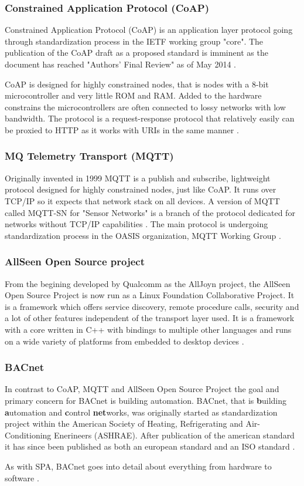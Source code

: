 \subsubsection{Constrained Application Protocol (CoAP)}
Constrained Application Protocol (CoAP) is an application layer protocol
going through standardization process in the IETF working group "core". The
publication of the CoAP draft as a proposed standard is imminent as the
document has reached "Authors' Final Review" as of May 2014 \cite{web:wgcore}.

CoAP is designed for highly constrained nodes, that is nodes with a 8-bit
microcontroller and very little ROM and RAM. Added to the hardware constrains
the microcontrollers are often connected to lossy networks with low bandwidth.
The protocol is a request-response protocol that relatively easily can be
proxied to HTTP as it works with URIs in the same manner \cite{web:draftcoap}.

\subsubsection{MQ Telemetry Transport (MQTT)}
Originally invented in 1999 MQTT is a publish and subscribe, lightweight
protocol designed for highly constrained nodes, just like CoAP. It runs
over TCP/IP so it expects that network stack on all devices. A version of MQTT
called MQTT-SN for "Sensor Networks" is a branch of the protocol dedicated for
networks without TCP/IP capabilities \cite{web:mqtt,web:mqtt-sn}. The main
protocol is undergoing standardization process in the OASIS organization, MQTT
Working Group \cite{web:oasis-mqtt}.

\subsubsection{AllSeen Open Source project}
From the begining developed by Qualcomm as the AllJoyn project, the AllSeen
Open Source Project is now run as a Linux Foundation Collaborative Project.
It is a framework which offers service discovery, remote procedure calls,
security and a lot of other features independent of the transport layer used.
It is a framework with a core written in C++ with bindings to multiple other
languages and runs on a wide variety of platforms from embedded to desktop
devices \cite{web:alljoyn,web:allseen}.

\subsubsection{BACnet}
In contrast to CoAP, MQTT and AllSeen Open Source Project the goal and primary
concern for BACnet is building automation. BACnet, that is \textbf{b}uilding
\textbf{a}utomation and \textbf{c}ontrol \textbf{net}works, was originally
started as standardization project within the American Society of Heating,
Refrigerating and Air-Conditioning Enerineers (ASHRAE). After publication of
the american standard it has since been published as both an european standard
and an ISO standard \cite{web:bacnet}.

As with SPA, BACnet goes into detail about everything from hardware to
software \cite{web:bacnet-slide15}.
